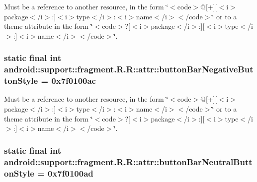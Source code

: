 Must be a reference to another resource, in the form \char`\"{}$<$code$>$@\mbox{[}+\mbox{]}\mbox{[}$<$i$>$package$<$/i$>$:\mbox{]}$<$i$>$type$<$/i$>$:$<$i$>$name$<$/i$>$$<$/code$>$\char`\"{} or to a theme attribute in the form \char`\"{}$<$code$>$?\mbox{[}$<$i$>$package$<$/i$>$:\mbox{]}\mbox{[}$<$i$>$type$<$/i$>$:\mbox{]}$<$i$>$name$<$/i$>$$<$/code$>$\char`\"{}. \hypertarget{classandroid_1_1support_1_1fragment_1_1_r_1_1attr_0eb2b5d8ca8471576a25c074d4229434}{
\subsubsection[{buttonBarNegativeButtonStyle}]{\setlength{\rightskip}{0pt plus 5cm}static final int android::support::fragment.R.R::attr::buttonBarNegativeButtonStyle = 0x7f0100ac}}
\label{classandroid_1_1support_1_1fragment_1_1_r_1_1attr_0eb2b5d8ca8471576a25c074d4229434}


Must be a reference to another resource, in the form \char`\"{}$<$code$>$@\mbox{[}+\mbox{]}\mbox{[}$<$i$>$package$<$/i$>$:\mbox{]}$<$i$>$type$<$/i$>$:$<$i$>$name$<$/i$>$$<$/code$>$\char`\"{} or to a theme attribute in the form \char`\"{}$<$code$>$?\mbox{[}$<$i$>$package$<$/i$>$:\mbox{]}\mbox{[}$<$i$>$type$<$/i$>$:\mbox{]}$<$i$>$name$<$/i$>$$<$/code$>$\char`\"{}. \hypertarget{classandroid_1_1support_1_1fragment_1_1_r_1_1attr_55288c503bf6e51ba0cfb499bf1f6144}{
\subsubsection[{buttonBarNeutralButtonStyle}]{\setlength{\rightskip}{0pt plus 5cm}static final int android::support::fragment.R.R::attr::buttonBarNeutralButtonStyle = 0x7f0100ad}}
\label{classandroid_1_1support_1_1fragment_1_1_r_1_1attr_55288c503bf6e51ba0cfb499bf1f6144}


